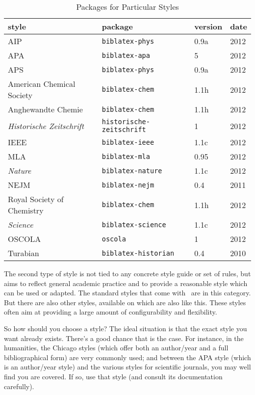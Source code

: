 \begin{table}
\caption{Packages for Particular Styles\label{ctan:bespoke}}
\small
\begin{tabular}{llll}
\toprule
\textsf{style} & \textsf{package} & \textsf{version} & \textsf{date}\\
\midrule AIP   & \texttt{biblatex-phys} & 0.9a & 2012 \\
APA            & \texttt{biblatex-apa} & 5 & 2012 \\
APS            & \texttt{biblatex-phys} & 0.9a & 2012 \\
American Chemical Society & \texttt{biblatex-chem} & 1.1h &
2012 \\
Anghewandte Chemie             & \texttt{biblatex-chem}           & 1.1h & 2012
\\
\textit{Historische Zeitschrift} &\texttt{historische-zeitschrift} & 1
& 2012 \\
IEEE            & \texttt{biblatex-ieee} & 1.1c & 2012 \\
MLA             & \texttt{biblatex-mla} & 0.95 & 2012 \\
\textit{Nature} & \texttt{biblatex-nature} & 1.1c & 2012 \\
NEJM            & \texttt{biblatex-nejm} & 0.4 & 2011 \\
Royal Society of Chemistry & \texttt{biblatex-chem} & 1.1h & 2012 \\
\textit{Science} & \texttt{biblatex-science} & 1.1c & 2012 \\
OSCOLA & \texttt{oscola} & 1 & 2012 \\
Turabian & \texttt{biblatex-historian} & 0.4 & 2010 \\
\bottomrule
\end{tabular}
\end{table}

The second type of style is not tied to any concrete style guide or
set of rules, but aims to reflect general academic practice and to
provide a reasonable style which can be used or
adapted. The standard styles that come with \biblatex\ are in this
category. But there are also other styles, available on
 which are also like this. These styles often aim at
providing a large amount of configurability and flexibility.

So how should you choose a style? The ideal situation is that the
exact style you want already exists. There's a good chance that is the
case. For instance, in the humanities, the Chicago styles (which offer
both an author/year and a full bibliographical form) are very commonly
used; and between the APA style (which is an author/year style) and
the various styles for scientific journals, you may well find you are
covered. If so, use that style (and consult its documentation
carefully).

